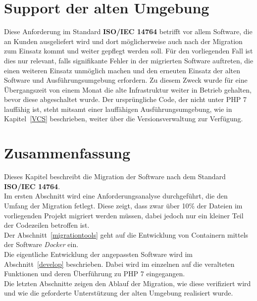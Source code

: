 \section{Support der alten Umgebung}
Diese Anforderung im Standard \textbf{ISO/IEC 14764} betrifft vor allem Software, die an Kunden ausgeliefert wird und dort möglicherweise auch nach der Migration 
zum Einsatz kommt und weiter gepflegt werden soll. Für den vorliegenden Fall ist dies nur relevant, falls signifikante Fehler in der migrierten Software auftreten, 
die einen weiteren Einsatz unmöglich machen und den erneuten Einsatz der alten Software und Ausführungsumgebung erfordern.
Zu diesem Zweck wurde für eine Übergangszeit von einem Monat die alte Infrastruktur weiter in Betrieb gehalten, bevor diese abgeschaltet wurde. Der ursprüngliche 
Code, der nicht unter \ac{PHP} 7 lauffähig ist, steht mitsamt einer lauffähigen Ausführungsumgebung, wie in Kapitel~\ref{VCS} beschrieben, weiter über die 
Versionsverwaltung zur Verfügung.

\section{Zusammenfassung}
Dieses Kapitel beschreibt die Migration der Software nach dem Standard \textbf{ISO/IEC 14764}. \\
Im ersten Abschnitt wird eine Anforderungsanalyse durchgeführt, die den Umfang der Migration fetlegt. Diese zeigt, dass 
zwar über 10\% der Dateien im vorliegenden Projekt migriert werden müssen, dabei jedoch nur ein kleiner Teil der Codezeilen 
betroffen ist. \\
Der Abschnitt~\ref{migrationtools} geht auf die Entwicklung von Containern mittels der Software \textit{Docker} ein. \\
Die eigentliche Entwicklung der angepassten Software wird im Abschnitt~\ref{develop} beschrieben. Dabei wird im einzelnen 
auf die veralteten Funktionen und deren Überführung zu \acs{PHP} 7 eingegangen. \\
Die letzten Abschnitte zeigen den Ablauf der Migration, wie diese verifiziert wird und wie die geforderte Unterstützung 
der alten Umgebung realisiert wurde.
